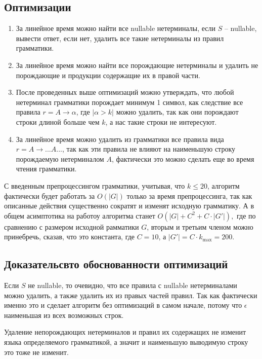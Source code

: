 \documentclass[12pt]{article}
\begin{document}
\subsection{Оптимизации}
\begin{enumerate}
    \item За линейное время можно найти все nullable нетерминалы,
          если $ S $ -- nullable, вывести ответ, если нет, удалить
          все такие нетерминалы из правил грамматики.
    \item За линейное время можно найти все порождающие нетерминалы
          и удалить не порождающие и продукции содержащие их в правой части.
    \item После проведенных выше оптимизаций можно утверждать, что любой
          нетерминал грамматики порождает минимум 1 символ, как следствие
          все правила $ r = A \rightarrow \alpha $, где $ |\alpha > k | $
          можно удалить, так как они порождают строки длиной больше чем
          $ k $, а нас такие строки не интересуют.
    \item За линейное время можно удалить из грамматики все правила вида
          $ r = A \rightarrow ... A ... $, так как эти правила не влияют
          на наименьшую строку порождаемую нетерминалом $ A $, фактически
          это можно сделать еще во время чтения грамматики.
\end{enumerate}

С введенным препроцессингом грамматики, учитывая, что $ k \le 20 $, алгоритм
фактически будет работать за $ O(|G|) $ только за время препроцессинга,
так как описанные действия существенно сократят и изменят исходную
грамматику. А в общем асимптотика на работоу алгоритма станет
$ O(|G| + C^2 + C \cdot |G'|), $ где по сравнению с размером исходной 
рамматики $ G $, вторым и третьим
членом можно принебречь, сказав, что это константа, где $ C = 10 $, а
$ |G'| = C \cdot k_{\max} = 200 $.

\subsection{Доказательсвто обоснованности оптимизаций}
Если $ S $ не nullable, то очевидно, что все правила с nullable
нетерминалами можно удалить, а также удалить их из правых частей правил.
Так как фактически именно это и сделает алгоритм без оптимизаций в самом
начале, потому что $ \epsilon $ наименьшая из всех возможных строк.

Удаление непорождающих нетерминалов и правил их содержащих не изменит языка
определяемого грамматикой, а значит и наименьшую выводимую строку это
тоже не изменит.
\end{document}

